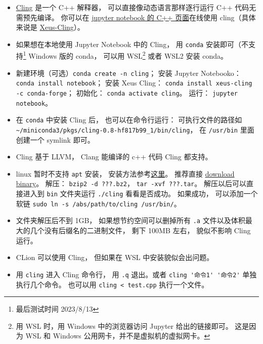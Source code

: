 
\begin{issues}
\issueDraft
\end{issues}

\begin{itemize}
\item \href{https://root.cern/cling/}{Cling} 是一个 C++ 解释器， 可以直接像动态语言那样逐行运行 C++ 代码无需预先编译。
你可以在 \href{https://jupyter.org/try}{jupyter notebook 的 C++ 页面}在线使用 cling（具体来说是 \href{https://xeus-cling.readthedocs.io/en/latest/index.html}{Xeus-Cling}）。
\item 如果想在本地使用 Jupyter Notebook 中的 Cling， 用 \verb|conda| 安装即可（不支持\footnote{最后测试时间 2023/8/13} Windows 版的 conda， 可以用 WSL\footnote{用 WSL 时，用 Windows 中的浏览器访问 Jupyter 给出的链接即可。 这是因为 WSL 和 Windows 公用网卡，并不是虚拟机的虚拟网卡。} 或者 WSL2 安装 conda。
\item 新建环境（可选）\verb|conda create -n cling|； 安装 Jupyter Notebooko：\verb|conda install notebook|； 安装 Xeus Cling： \verb|conda install xeus-cling -c conda-forge|； 初始化： \verb|conda activate cling|。 运行： \verb|jupyter notebook|。
\item 在 \verb|conda| 中安装 Cling 后， 也可以在命令行运行： 可执行文件的路径如 \verb|~/miniconda3/pkgs/cling-0.8-hf817b99_1/bin/cling|， 在 \verb|/usr/bin| 里面创建一个 symlink 即可。
\item Cling 基于 LLVM， Clang 能编译的 c++ 代码 Cling 都支持。
\item linux 暂时不支持 \verb|apt| 安装， 安装方法参考\href{https://kaustubh13.medium.com/how-to-install-cling-on-linux-or-wsl-8125798ed9b9}{这里}。 推荐直接 \href{https://root.cern/download/cling/}{download binary}。 解压： \verb|bzip2 -d ???.bz2|， \verb|tar -xvf ???.tar|。 解压以后可以直接进入到 \verb|bin| 文件夹运行 \verb|./cling| 看看是否成功。 如果成功， 可以添加一个软链 \verb|sudo ln -s /abs/path/to/cling /usr/bin/|。
\item 文件夹解压后不到 1GB， 如果想节约空间可以删掉所有 \verb|.a| 文件以及体积最大的几个没有后缀名的二进制文件， 剩下 100MB 左右， 貌似不影响 Cling 运行。
\item CLion 可以使用 Cling， 但如果在 WSL 中安装貌似会出问题。
\item 用 \verb|cling| 进入 Cling 命令行， 用 \verb|.q| 退出。或者 \verb|cling '命令1' '命令2'| 单独执行几个命令。 也可以用 \verb|cling < test.cpp| 执行一个文件。

\end{itemize}
